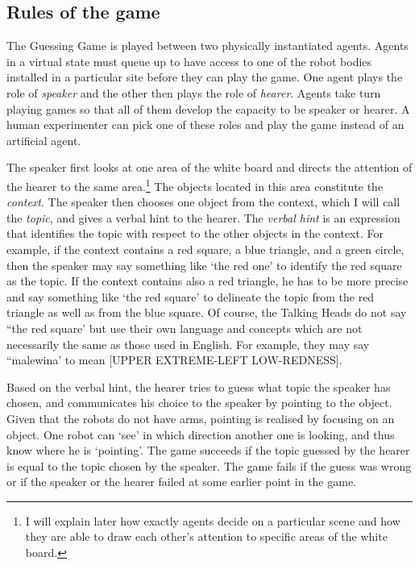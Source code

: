 \subsection{Rules of the game}

The Guessing Game is played between two 
physically instantiated agents. Agents in 
a virtual state must queue up to have access to one of the 
robot bodies installed in a particular site before
they can play the game. One agent 
plays the role of {\itshape speaker} and the other then plays the 
role of {\itshape hearer}. Agents take turn playing games 
so that all of them develop the capacity to be speaker or hearer.
A human experimenter can pick one of these roles and 
play the game instead of an artificial agent. 

The speaker first looks at one area of the white board and 
directs the attention of the hearer to the same area.\footnote{
I will explain later how exactly agents
decide on a particular scene and how they are able to 
draw each other's attention to specific areas of the 
white board.}
The objects located in this area constitute the {\itshape context}. 
The speaker then chooses one object from the context, which 
I will call the {\itshape topic}, and gives a verbal hint
to the hearer. The {\itshape verbal hint} is an expression
that identifies the topic 
with respect to the other objects in the context. For example, 
if the context contains a red square, a blue triangle, 
and a green circle, then the speaker may say something like 
`the red one' to identify the red square as the topic. 
If the context contains also a red triangle, he has to be more 
precise and say something like `the red square' to delineate
the topic from the red triangle as well as
from the blue square. 
Of course, the Talking Heads do not say ``the red square'
but use their own language and concepts which are not 
necessarily the same as those used in English. For example, 
they may say ``malewina' to mean [UPPER EXTREME-LEFT LOW-REDNESS]. 

Based on the verbal hint, the hearer tries to guess what
topic the speaker has chosen, and communicates his choice 
to the speaker by pointing to the object. Given that 
the robots do not have arms, pointing is realised by 
focusing on an object. One robot can `see' in which direction another one 
is looking, and thus know where he is `pointing'. 
The game succeeds if the topic guessed by the hearer is 
equal to the topic chosen by the speaker. 
The game fails if the guess was wrong or 
if the speaker or the hearer failed at some earlier point in the 
game. 

